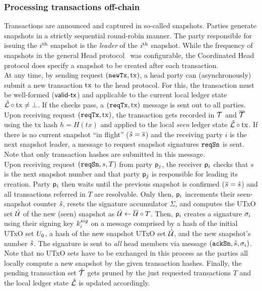 \subsubsection{Processing transactions off-chain}

Transactions are announced and captured in so-called snapshots. Parties generate
snapshots in a strictly sequential round-robin manner. The party responsible for
issuing the $i^{\text{th}}$ snapshot is the \emph{leader} of the $i^{\text{th}}$ snapshot.
While the frequency of snapshots in the general Head protocol~\cite{hydrahead20}
was configurable, the Coordinated Head protocol does specify a snapshot to be
created after each transaction.\\

\quad At any time, by sending request $(\mathtt{newTx},\mathrm{tx})$, a
head party can (asynchronously) submit a new transaction $\mathrm{tx}$ to the head
protocol. For this, the transaction must be well-formed ($\mathsf{valid\textsf{-}{}tx}$) and applicable to the current local ledger state
$\hat {\mathcal L} \circ \mathrm{tx} \neq \bot$. If the checks
pass, a $(\mathtt{reqTx},\mathrm{tx})$ message is sent out to all parties.\\

\quad Upon receiving request $(\mathtt{reqTx},\mathrm{tx})$, the transaction gets
recorded in ${\mathcal T}$ and $\overline {\mathcal T}$ using the tx hash $h = H(tx)$ and applied to the
local \emph{seen} ledger state $\hat {\mathcal L} \circ \mathrm{tx}$. If there is no current
snapshot ``in flight'' ($\hat s = \overline s$) and the receiving party $i$ is the next
snapshot leader, a message to request snapshot signatures $\mathtt{reqSn}$ is sent. Note
that only transaction hashes are submitted in this message. \\

\quad Upon receiving request $(\mathtt{reqSn},s,T)$ from party $\mathsf p_j$,
the receiver $\mathsf p_i$ checks that $s$ is the next snapshot number and that
party $\mathsf p_j$ is responsible for leading its creation. Party $\mathsf p_i$ then
waits until the previous snapshot is confirmed ($\overline s = \hat s$) and all
transactions referred in $T$  are
resolvable. Only then, $\mathsf p_i$
increments their seen-snapshot counter $\hat s$, resets the signature accumulator
$\Sigma$, and computes the UTxO set $\hat {\mathcal U}$ of the new (seen) snapshot as
$\hat {\mathcal U} \gets \overline {\mathcal U} \circ T$. Then, $\mathsf p_i$ creates a signature
$\sigma_i$ using their signing key $k^{sig}_i$ on a message comprised by a hash of
the initial UTxO set $U_{0}$, a hash
of the new snapshot UTxO set $\hat {\mathcal U}$, and the new snapshot's number $\hat s$.
The signature is sent to \emph{all} head members via message
$(\mathtt{ackSn},\hat s,\sigma_i)$. Note that no UTxO sets have to be exchanged in this
process as the parties all locally compute a new snapshot by the given
transaction hashes. Finally, the pending transaction set $\hat {\mathcal T}$ gets pruned by
the just requested transactions $T$ and the local ledger state
$\hat {\mathcal L}$ is updated accordingly.\\

